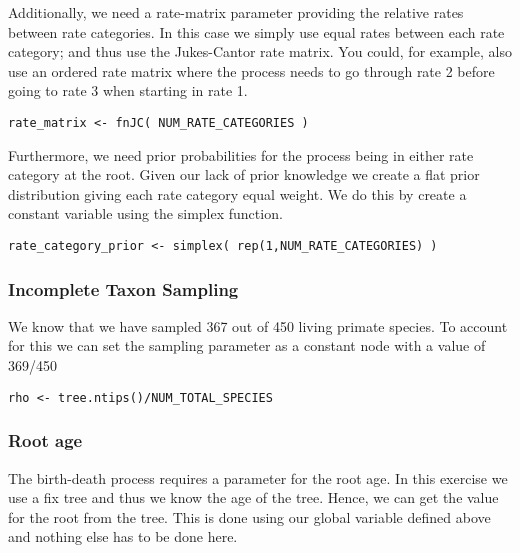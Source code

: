 Additionally, we need a rate-matrix parameter providing the relative rates between rate categories.
In this case we simply use equal rates between each rate category; and thus use the Jukes-Cantor rate matrix.
You could, for example, also use an ordered rate matrix where the process needs to go through rate 2 before going to rate 3 when starting in rate 1.
{\tt \begin{snugshade*}
\begin{lstlisting}
rate_matrix <- fnJC( NUM_RATE_CATEGORIES )
\end{lstlisting}
\end{snugshade*}}
Furthermore, we need prior probabilities for the process being in either rate category at the root.
Given our lack of prior knowledge we create a flat prior distribution giving each rate category equal weight.
We do this by create a constant variable using the simplex function.
{\tt \begin{snugshade*}
\begin{lstlisting}
rate_category_prior <- simplex( rep(1,NUM_RATE_CATEGORIES) )
\end{lstlisting}
\end{snugshade*}}



\subsubsection{Incomplete Taxon Sampling}

We know that we have sampled 367 out of 450 living primate species. 
To account for this we can set the sampling parameter as a constant node with a value of 369/450
{\tt \begin{snugshade*}
\begin{lstlisting}
rho <- tree.ntips()/NUM_TOTAL_SPECIES
\end{lstlisting}
\end{snugshade*}}


\subsubsection{Root age}

The birth-death process requires a parameter for the root age.
In this exercise we use a fix tree and thus we know the age of the tree.
Hence, we can get the value for the root from the \citet{Springer2012} tree.
This is done using our global variable  defined above and nothing else has to be done here.

